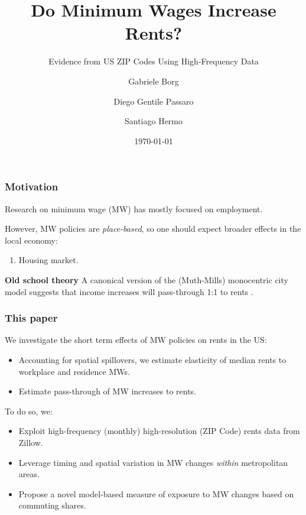 \documentclass[aspectratio=169]{beamer}
\title{Do Minimum Wages Increase Rents?}
\subtitle{Evidence from US ZIP Codes Using High-Frequency Data}
\date{\today}
\author{Gabriele Borg \and Diego Gentile Passaro \and Santiago Hermo}
\institute{Brown University}
\begin{document}
\maketitle



\begin{frame}
	\frametitle{Motivation}
	
	Research on minimum wage (MW) has mostly focused on employment.
	
	\vspace{1.5mm}
	However, MW policies are \textit{place-based}, so one should expect broader effects 
	in the local economy:
	\begin{enumerate}[$\Rightarrow$]
		\item Housing market.
	\end{enumerate}

	\pause
	\vspace{3mm}
	\textbf{Old school theory}
        A canonical version of the (Muth-Mills) monocentric city model suggests that income increases will 
        pass-through 1:1 to rents \parencite{Brueckner1987}.
\end{frame}

\begin{frame}
	\frametitle{This paper}
	We investigate the short term effects of MW policies on rents in the US:
	\begin{itemize}
		\vspace{.5mm} \item Accounting for spatial spillovers, we estimate 
		elasticity of median rents to workplace and residence MWs.
		\vspace{.5mm} \item Estimate pass-through of MW increases to rents.
	\end{itemize}
	
	\vspace{3mm}
	\pause
	To do so, we:
	\begin{itemize}
    	\vspace{.5mm} \item Exploit high-frequency (monthly) high-resolution 
    	(ZIP Code) rents data from Zillow.
    	\vspace{.5mm} \item Leverage timing and spatial variation in MW changes 
    	\textit{within} metropolitan areas.
    	\vspace{.5mm} \item Propose a novel model-based measure of exposure to MW changes based on 
    	commuting shares.
	\end{itemize}
\end{frame}
\end{document}
